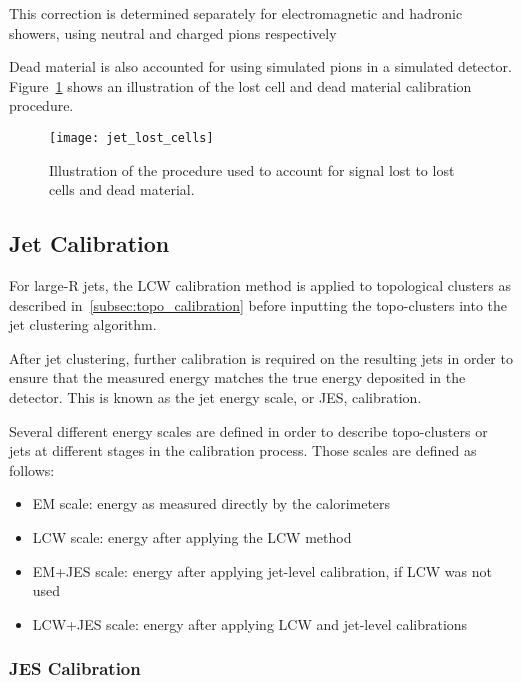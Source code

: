 This correction is determined separately for electromagnetic and hadronic showers, using neutral and charged pions
respectively\cite{jet-topo-cluster}

Dead material is also accounted for using simulated pions in a simulated detector.
Figure~\ref{fig:jet_lost_cells} shows an illustration of the lost cell and dead material calibration procedure.

\begin{figure}[!ht]
    \centering
\texttt{[image: jet\_lost\_cells]}
\caption{Illustration of the procedure used to account for signal lost to lost cells and dead material.}
\label{fig:jet_lost_cells}\cite{jet-topo-cluster}
\end{figure}

\subsection{Jet Calibration}\label{subsec:jet_calibration}
For large-R jets, the LCW calibration method is applied to topological clusters as described
in~\ref{subsec:topo_calibration} before inputting the topo-clusters into the jet clustering algorithm.

After jet clustering, further calibration is required on the resulting jets in order to ensure that the measured
energy matches the true energy deposited in the detector.
This is known as the jet energy scale, or JES, calibration.

Several different energy scales are defined in order to describe topo-clusters or jets at different stages in the
calibration process.
Those scales are defined as follows:

\begin{itemize}
    \item EM scale: energy as measured directly by the calorimeters
    \item LCW scale: energy after applying the LCW method
    \item EM+JES scale: energy after applying jet-level calibration, if LCW was not used
    \item LCW+JES scale: energy after applying LCW and jet-level calibrations
\end{itemize}

\subsubsection{JES Calibration}\label{subsubsec:jes_calibration}

